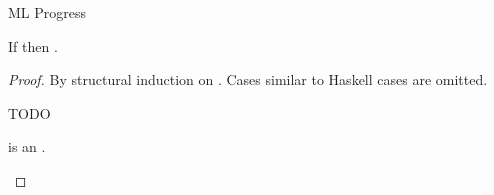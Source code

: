 \begin{theorem}{ML Progress}

\label{thmpsm}

If \judem{}{\first{\varexpm}}{\vartym} then \pshyp{\first{\varexpm}}{\second{\varexpm}}.

\begin{proof}

By structural induction on \first{\varexpm}.  Cases similar to Haskell cases are omitted.


\newcommand{\psmh}{\expmh{\first{\vartym}}{\first{\vartyh}}{\first{\varexph}}\xspace}

\begin{case}{\psmh}

\pshypby
{\first{\varexph}}
{\second{\varexph}}
\pscasestwo
{\first{\varexph}}
{\first{\vartym}}
{\first{\vartyh}}
{\psmh}


TODO

\begin{subcase}{}

\end{subcase}

\pssub
{\first{\varexph}}
{\second{\varexph}}
{\psmh}
{\expmh{\first{\vartym}}{\first{\vartyh}}{\second{\varexph}}}
\pserr
{\first{\varexph}}
{\psmh}

\end{case}


\newcommand{\psconswm}{\expcons{\first{\varvalum}}{\second{\varvalum}}\xspace}

\begin{case}{\psconswm}

\psconswm is an \prouv.

\end{case}


\newcommand{\psfappm}{\expfapp{\first{\varexpm}}{\second{\varexpm}}}
\renewcommand{\x}{\expfabss{\varvarm}{\first{\vartym}}{\third{\varexpm}}}

\begin{case}{\psfappm}

\pshypby
{\first{\varexpm}}
{\third{\varexpm}}
\psvalifeqm
{\first{\varexpm}}
{\tyfun{\first{\vartym}}{\second{\vartym}}}
{\x}
\pssub
{\first{\varexpm}}
{\third{\varexpm}}
{\psfappm}
{\expfapp{\third{\varexpm}}{\second{\varexpm}}}
\pserr
{\first{\varexpm}}
{\psfappm}
\pshypby
{\second{\varexpm}}
{\third{\varexpm}}
\pssuband
{\second{\varexpm}}
{\third{\varexpm}}
{\first{\varexpm}}
{\psfappm}
{\expfapp{\first{\varexpm}}{\third{\varexpm}}}
\pserrand
{\second{\varexpm}}
{\first{\varexpm}}
{\psfappm}
\psred
{\expfapp{(\x)}{\second{\varexpm}}}
{\expsubst{\third{\varexpm}}{\second{\varexpm}}{\varvarm}}


\end{case}
\end{proof}
\end{theorem}
